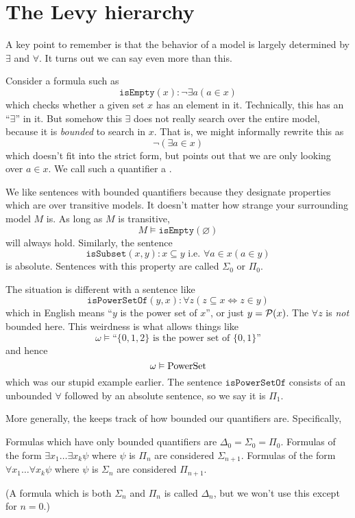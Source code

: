 \section{The Levy hierarchy}
A key point to remember is that the behavior of a model is largely determined by $\exists$ and $\forall$.
It turns out we can say even more than this.

Consider a formula such as
\[ \mathtt{isEmpty}(x) : \neg \exists a (a \in x) \]
which checks whether a given set $x$ has an element in it.
Technically, this has an ``$\exists$'' in it.
But somehow this $\exists$ does not really search over the entire model,
because it is \emph{bounded} to search in $x$.
That is, we might informally rewrite this as
\[ \neg (\exists a \in x) \]
which doesn't fit into the strict form,
but points out that we are only looking over $a \in x$.
We call such a quantifier a .

We like sentences with bounded quantifiers because they designate
properties which are  over transitive models.
It doesn't matter how strange your surrounding model $M$ is.
As long as $M$ is transitive,
\[ M \vDash \mathtt{isEmpty}(\varnothing) \]
will always hold.
Similarly, the sentence
\[ \mathtt{isSubset}(x,y) : x \subseteq y \text { i.e. } \forall a \in x (a \in y) \]
is absolute.
Sentences with this property are called $\Sigma_0$ or $\Pi_0$.

The situation is different with a sentence like
\[
	\mathtt{isPowerSetOf}(y,x) :
	\forall z \left( z \subseteq x \iff z \in y  \right)
\]
which in English means ``$y$ is the power set of $x$'', or just $y = \mathcal P(x)$.
The $\forall z$ is \emph{not} bounded here.
This weirdness is what allows things like
\[ \omega \vDash \text{``$\{0,1,2\}$ is the power set of $\{0,1\}$''} \]
and hence
\[ \omega \vDash \mathrm{PowerSet} \]
which was our stupid example earlier.
The sentence $\mathtt{isPowerSetOf}$ consists of an unbounded $\forall$ followed
by an absolute sentence, so we say it is $\Pi_1$.

More generally, the  keeps track of how bounded our
quantifiers are.
Specifically,
\begin{itemize}
	\ii Formulas which have only bounded quantifiers
	are $\Delta_0 = \Sigma_0 = \Pi_0$.
	\ii Formulas of the form $\exists x_1 \dots \exists x_k \psi$
	where $\psi$ is $\Pi_n$ are considered $\Sigma_{n+1}$.
	\ii Formulas of the form $\forall x_1 \dots \forall x_k \psi$
	where $\psi$ is $\Sigma_n$ are considered $\Pi_{n+1}$.
\end{itemize}
(A formula which is both $\Sigma_n$ and $\Pi_n$ is called $\Delta_n$, but we won't
use this except for $n=0$.)

